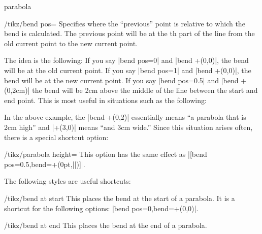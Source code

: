 \begin{pathoperation}{parabola}{}
    \begin{key}{/tikz/bend pos=}
        Specifies where the ``previous'' point is relative to which the bend is
        calculated. The previous point will be at the th part of
        the line from the old current point to the new current point.

        The idea is the following: If you say |bend pos=0| and |bend +(0,0)|,
        the bend will be at the old current point. If you say |bend pos=1| and
        |bend +(0,0)|, the bend will be at the new current point. If you say
        |bend pos=0.5| and |bend +(0,2cm)| the bend will be 2cm above the
        middle of the line between the start and end point. This is most useful
        in situations such as the following:
\begin{codeexample}[]
\end{codeexample}

        In the above example, the |bend +(0,2)| essentially means ``a parabola
        that is 2cm high'' and |+(3,0)| means ``and 3cm wide.'' Since this
        situation arises often, there is a special shortcut option:
        \begin{key}{/tikz/parabola height=}
            This option has the same effect as
            |[bend pos=0.5,bend={+(0pt,||)}]|.
\begin{codeexample}[]
\end{codeexample}
        \end{key}
    \end{key}

    The following styles are useful shortcuts:
    \begin{stylekey}{/tikz/bend at start}
        This places the bend at the start of a parabola. It is a shortcut for
        the following options: |bend pos=0,bend={+(0,0)}|.
    \end{stylekey}

    \begin{stylekey}{/tikz/bend at end}
        This places the bend at the end of a parabola.
    \end{stylekey}
\end{pathoperation}


